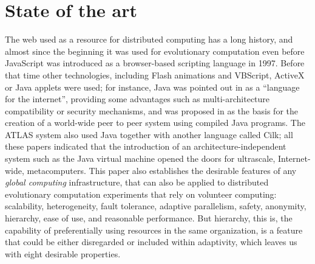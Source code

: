 \documentclass[journal,onecolumn]{IEEEtran}
\begin{document}
\section{State of the art}
\label{sec:soa}

The web used as a resource for distributed computing has a
long history, and almost since the beginning it was used for
evolutionary computation even before JavaScript was
introduced as a browser-based scripting language in 1997. Before that
time other technologies,
 including Flash animations and VBScript, ActiveX or Java applets were
used; for instance, Java was pointed out in \cite{soares1998get} as a
``language for the
internet'', providing some advantages such as multi-architecture compatibility or
security mechanisms, and was proposed in \cite{chandy1996world} as the
basis for the creation of a world-wide peer to peer system using compiled Java
programs. The ATLAS system
\cite{Baldeschwieler:1996:TIG:504450.504482} also used Java together
with another language called Cilk; all these papers indicated that
the introduction of an architecture-independent system such as the
Java virtual machine opened the doors for ultrascale, Internet-wide,
metacomputers. This paper also establishes the desirable features of
any {\em global computing} infrastructure, that can also be applied to
distributed evolutionary computation experiments that rely on
volunteer computing: scalability, heterogeneity, fault tolerance,
adaptive parallelism, safety, anonymity, hierarchy, ease of use, and
reasonable performance. But hierarchy, this is, the capability of
preferentially using resources in the same organization, is a feature
that could be either disregarded or included within adaptivity, which
leaves us with eight desirable properties. 
\end{document}
